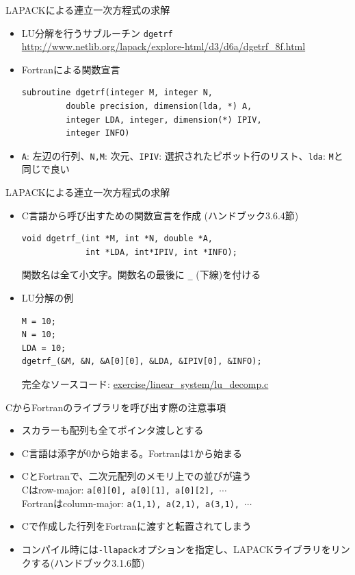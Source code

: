 \documentclass[dvipdfmx]{beamer}
\begin{document}
\begin{frame}[t,fragile]{LAPACKによる連立一次方程式の求解}
  \begin{itemize}
    \setlength{\itemsep}{1em}
  \item LU分解を行うサブルーチン {\tt dgetrf} \\
    \url{http://www.netlib.org/lapack/explore-html/d3/d6a/dgetrf_8f.html}
  \item Fortranによる関数宣言
\begin{lstlisting}
subroutine dgetrf(integer M, integer N,
         double precision, dimension(lda, *) A,
         integer LDA, integer, dimension(*) IPIV,
         integer INFO)
\end{lstlisting}
\item {\tt A}: 左辺の行列、{\tt N,M}: 次元、{\tt IPIV}: 選択されたピボット行のリスト、{\tt lda}: {\tt M}と同じで良い
  \end{itemize}
\end{frame}

\begin{frame}[t,fragile]{LAPACKによる連立一次方程式の求解}
  \begin{itemize}
    \setlength{\itemsep}{1em}
  \item C言語から呼び出すための関数宣言を作成 (ハンドブック3.6.4節)
\begin{lstlisting}
void dgetrf_(int *M, int *N, double *A,
             int *LDA, int*IPIV, int *INFO);
\end{lstlisting}
関数名は全て小文字。関数名の最後に {\tt \_} (下線)を付ける
\item LU分解の例
\begin{lstlisting}
M = 10;
N = 10;
LDA = 10;
dgetrf_(&M, &N, &A[0][0], &LDA, &IPIV[0], &INFO);
\end{lstlisting}
完全なソースコード: \href{https://github.com/todo-group/computer-experiments/blob/master/exercise/linear_system/lu_decomp.c}{exercise/linear\_system/lu\_decomp.c}
  \end{itemize}
\end{frame}

\begin{frame}[t,fragile]{CからFortranのライブラリを呼び出す際の注意事項}
  \begin{itemize}
    \setlength{\itemsep}{1em}
  \item スカラーも配列も全てポインタ渡しとする
  \item C言語は添字が0から始まる。Fortranは1から始まる
  \item CとFortranで、二次元配列のメモリ上での並びが違う \\
    Cはrow-major: {\tt a[0][0], a[0][1], a[0][2], $\cdots$} \\
    Fortranはcolumn-major: {\tt a(1,1), a(2,1), a(3,1), $\cdots$} \\
  \item Cで作成した行列をFortranに渡すと転置されてしまう
  \item コンパイル時には{\tt -llapack}オプションを指定し、LAPACKライブラリをリンクする(ハンドブック3.1.6節)
  \end{itemize}
\end{frame}
\end{document}
